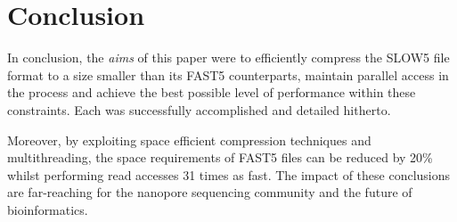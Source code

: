 \section{Conclusion}

In conclusion, the \textit{aims} of this paper  were to efficiently compress the SLOW5 file format to a size smaller than its FAST5 counterparts, maintain parallel access in the process and achieve the best possible level of performance within these constraints. Each was successfully accomplished and detailed hitherto.

Moreover, by exploiting space efficient compression techniques and multithreading, the space requirements of FAST5 files can be reduced by 20\% whilst performing read accesses 31 times as fast. The impact of these conclusions are far-reaching for the nanopore sequencing community and the future of bioinformatics.
